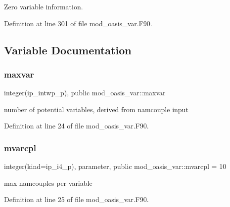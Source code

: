 Zero variable information. 



Definition at line 301 of file mod\+\_\+oasis\+\_\+var.\+F90.



\subsection{Variable Documentation}
\mbox{\label{namespacemod__oasis__var_a151c4be67882fc8d02f66e4a1822b692}} 
\subsubsection{\texorpdfstring{maxvar}{maxvar}}
{\footnotesize\ttfamily integer(ip\+\_\+intwp\+\_\+p), public mod\+\_\+oasis\+\_\+var\+::maxvar}



number of potential variables, derived from namcouple input 



Definition at line 24 of file mod\+\_\+oasis\+\_\+var.\+F90.

\mbox{\label{namespacemod__oasis__var_a687d6dce16699f36ae3a67accfdba3a9}} 
\subsubsection{\texorpdfstring{mvarcpl}{mvarcpl}}
{\footnotesize\ttfamily integer(kind=ip\+\_\+i4\+\_\+p), parameter, public mod\+\_\+oasis\+\_\+var\+::mvarcpl = 10}



max namcouples per variable 



Definition at line 25 of file mod\+\_\+oasis\+\_\+var.\+F90.

\mbox{\label{namespacemod__oasis__var_a095f8ad84e6afbcbe1744d4a9f924e08}} 
